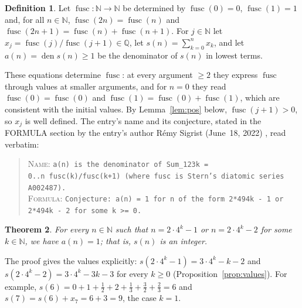\documentclass[11pt]{amsart}
\theoremstyle{plain}
\newtheorem{theorem}{Theorem}
\theoremstyle{definition}
\newtheorem{definition}[theorem]{Definition}
\newcommand{\N}{\mathbb{N}}
\newcommand{\Q}{\mathbb{Q}}
\DeclareMathOperator{\fusc}{fusc}
\DeclareMathOperator{\den}{den}
\begin{document}
\begin{definition}\label{def:main}
Let $\fusc\colon\N\to\N$ be determined by $\fusc(0)=0$, $\fusc(1)=1$ and, for all $n\in\N$, $\fusc(2n)=\fusc(n)$ and $\fusc(2n+1)=\fusc(n)+\fusc(n+1)$. For $j\in\N$ let $x_j=\fusc(j)/\fusc(j+1)\in\Q$, let $s(n)=\sum_{k=0}^{n}x_k$, and let $a(n)=\den s(n)\ge1$ be the denominator of $s(n)$ in lowest terms.
\end{definition}

These equations determine $\fusc$: at every argument $\ge2$ they express $\fusc$ through values at smaller arguments, and for $n=0$ they read $\fusc(0)=\fusc(0)$ and $\fusc(1)=\fusc(0)+\fusc(1)$, which are consistent with the initial values. By Lemma~\ref{lem:pos} below, $\fusc(j+1)>0$, so $x_j$ is well defined. The entry's name and its conjecture, stated in the FORMULA section by the entry's author R\'emy Sigrist (June~18, 2022) \cite{A355076}, read verbatim:
\begin{quote}\raggedright
\textsc{Name}: \texttt{a(n) is the denominator of Sum\_\char123k = 0..n\ fusc(k)/fusc(k+1) (where fusc is Stern's diatomic series A002487).}\\[2pt]
\textsc{Formula}: \texttt{Conjecture: a(n) = 1 for n of the form 2*4\char94k - 1 or 2*4\char94k - 2 for some k >= 0.}
\end{quote}

\begin{theorem}\label{thm:main}
For every $n\in\N$ such that $n=2\cdot4^k-1$ or $n=2\cdot4^k-2$ for some $k\in\N$, we have $a(n)=1$; that is, $s(n)$ is an integer.
\end{theorem}

The proof gives the values explicitly: $s(2\cdot4^k-1)=3\cdot4^k-k-2$ and $s(2\cdot4^k-2)=3\cdot4^k-3k-3$ for every $k\ge0$ (Proposition~\ref{prop:values}). For example, $s(6)=0+1+\frac12+2+\frac13+\frac32+\frac23=6$ and $s(7)=s(6)+x_7=6+3=9$, the case $k=1$.
\end{document}
